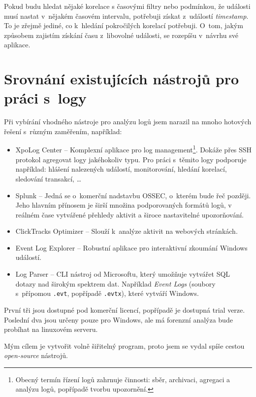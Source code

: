 \documentclass[thesis=B,czech]{FITthesis}[2012/06/26]
\begin{document}
Pokud budu hledat nějaké korelace s časovými filtry nebo podmínkou, že události musí nastat v~nějakém časovém intervalu, potřebuji získat z~událostí \textit{timestamp}. To je zřejmě jediné, co k~hledání pokročilých korelací potřebuji. O~tom, jakým způsobem zajistím získání času z~libovolné události, se rozepíšu v~návrhu své aplikace.

\section{Srovnání existujících nástrojů pro práci s~logy}
Při vybírání vhodného nástroje pro analýzu logů jsem narazil na mnoho hotových řešení s~různým zaměřením, například:

\begin{itemize}	
	\item{XpoLog Center -- Komplexní aplikace pro log management\footnote{Obecný termín řízení logů zahrnuje činnosti: sběr, archivaci, agregaci a analýzu logů, popřípadě tvorbu upozornění.}. Dokáže přes SSH protokol agregovat logy jakéhokoliv typu. Pro práci s~těmito logy podporuje například: hlášení nalezených událostí, monitorování, hledání korelací, sledování transakcí, \ldots
\cite{xpoLog}}
	\item{Splunk -- Jedná se o~komerční nadstavbu OSSEC, o~kterém bude řeč později. Jeho hlavním přínosem je širší množina podporovaných formátů logů, v reálném čase vytvářené přehledy aktivit a široce nastavitelné upozorňování. \cite{logManagement}}
	\item{ClickTracks Optimizer -- Slouží k~analýze aktivit na webových stránkách. \cite{clicktracks}}
	\item{Event Log Explorer -- Robustní aplikace pro interaktivní zkoumání Windows událostí. \cite{forensicWithOpenSource}}
	\item{Log Parser -- CLI nástroj od Microsoftu, který umožňuje vytvářet SQL dotazy nad širokým spektrem dat. Například \textit{Event Logs} (soubory s~přípomou \texttt{.evt}, popřípadě \texttt{.evtx}), které vytváří Windows. \cite{forensicWithOpenSource}}
\end{itemize}

První tři jsou dostupné pod komerční licencí, popřípadě je dostupná trial verze. Poslední dva jsou určeny pouze pro Windows, ale má forenzní analýza bude probíhat na linuxovém serveru.

Mým cílem je vytvořit volně šiřitelný program, proto jsem se vydal spíše cestou \textit{open-source} nástrojů.
\end{document}
